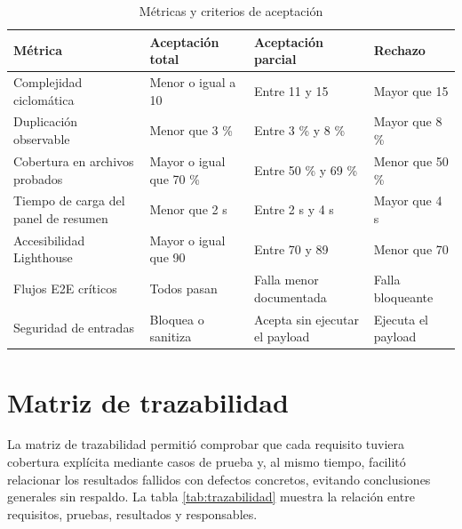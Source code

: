 \documentclass[11pt,spanish]{article}
\begin{document}
\begin{table}[H]
\centering
\caption{Métricas y criterios de aceptación}
\label{tab:metricas-aceptacion}
\begin{tabularx}{\textwidth}{p{4.1cm} p{3.2cm} p{3.2cm} Y}
\toprule
\textbf{Métrica} & \textbf{Aceptación total} & \textbf{Aceptación parcial} & \textbf{Rechazo} \\
\midrule
Complejidad ciclomática & Menor o igual a 10 & Entre 11 y 15 & Mayor que 15 \\
Duplicación observable & Menor que 3 \% & Entre 3 \% y 8 \% & Mayor que 8 \% \\
Cobertura en archivos probados & Mayor o igual que 70 \% & Entre 50 \% y 69 \% & Menor que 50 \% \\
Tiempo de carga del panel de resumen & Menor que 2 s & Entre 2 s y 4 s & Mayor que 4 s \\
Accesibilidad Lighthouse & Mayor o igual que 90 & Entre 70 y 89 & Menor que 70 \\
Flujos E2E críticos & Todos pasan & Falla menor documentada & Falla bloqueante \\
Seguridad de entradas & Bloquea o sanitiza & Acepta sin ejecutar el payload & Ejecuta el payload \\
\bottomrule
\end{tabularx}
\end{table}

\section{Matriz de trazabilidad}

La matriz de trazabilidad permitió comprobar que cada requisito tuviera cobertura explícita mediante casos de prueba y, al mismo tiempo, facilitó relacionar los resultados fallidos con defectos concretos, evitando conclusiones generales sin respaldo. La tabla \ref{tab:trazabilidad} muestra la relación entre requisitos, pruebas, resultados y responsables.
\end{document}
